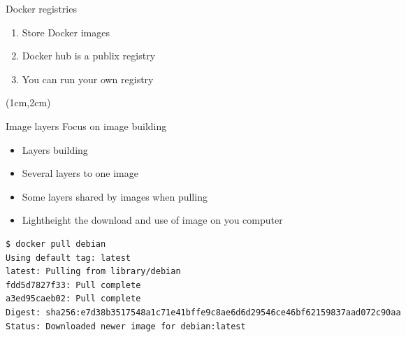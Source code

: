 \begin{frame}[<+->]{Docker registries}
\begin{enumerate}
\item Store Docker images
\item Docker hub is a publix registry
\item You can run your own registry
\end{enumerate}
\begin{textblock*}{10cm}(1cm,2cm)
\end{textblock*}
\end{frame}

\begin{frame}[<+->][fragile]{Image layers}
Focus on image building
\begin{itemize}
\item Layers building
\item Several layers to one image
\item Some layers shared by images when pulling
\item Lightheight the download and use of image on you computer
\end{itemize}
\begin{verbatim}
$ docker pull debian
Using default tag: latest
latest: Pulling from library/debian
fdd5d7827f33: Pull complete
a3ed95caeb02: Pull complete
Digest: sha256:e7d38b3517548a1c71e41bffe9c8ae6d6d29546ce46bf62159837aad072c90aa
Status: Downloaded newer image for debian:latest
\end{verbatim}
\end{frame}

